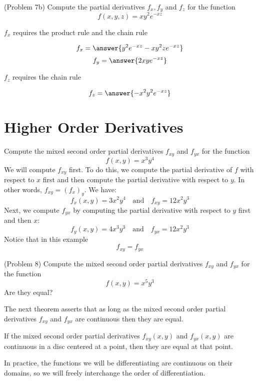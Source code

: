 \documentclass[handout]{ximera}
\begin{document}
\begin{problem}(Problem 7b)
Compute the partial derivatives $f_x, f_y$ and $f_z$ for the function
\[
f(x,y,z) = xy^2 e^{-xz}
\]
\begin{hint}
$f_x$ requires the product rule and the chain rule
\end{hint}

\[
f_x = \answer{y^2e^{-xz} - xy^2ze^{-xz}}
\]
\[
f_y = \answer{2xye^{-xz}}
\]
\begin{hint}
$f_z$ requires the chain rule
\end{hint}

\[
f_z = \answer{-x^2y^2 e^{-xz}}
\]
\end{problem}


\section{Higher Order Derivatives}

\begin{example}[Example 8]
Compute the mixed second order partial derivatives $f_{xy}$ and $f_{yx}$ for the function 
\[
f(x,y) = x^3y^4
\]
We will compute $f_{xy}$ first.  To do this, we compute the partial derivative of $f$ with respect to $x$ first and then compute the partial 
derivative with respect to $y$.  In other words, $f_{xy} = (f_x)_y$.  We have:
\[
f_x(x,y) = 3x^2y^4 \quad \text{and} \quad f_{xy} = 12x^2y^3
\]
Next, we compute $f_{yx}$ by computing the partial derivative with respect to $y$ first and then $x$:
\[
f_y(x,y) = 4x^3y^3 \quad \text{and} \quad f_{yx} = 12x^2y^3
\]
Notice that in this example
\[
f_{xy} = f_{yx}
\]
\end{example}

\begin{problem}(Problem 8)
Compute the mixed second order partial derivatives $f_{xy}$ and $f_{yx}$ for the function 
\[
f(x,y) = x^5 y^3
\]
Are they equal?
\end{problem}

The next theorem asserts that as long as the mixed second order partial derivatives $f_{xy}$ and $f_{yx}$  are continuous then they are equal.
\begin{theorem}
If the mixed second order partial derivatives $f_{xy}(x,y)$ and $f_{yx}(x,y)$ are continuous in a disc centered at a point, 
then they are equal at that point.
\end{theorem}


\begin{remark}
In practice, the functions we will be differentiating are continuous on their domains, 
so we will freely interchange the order of differentiation.
\end{remark}
\end{document}
